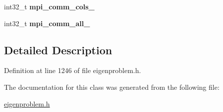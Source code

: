 \begin{DoxyCompactItemize}
\item 
\hypertarget{class_eigenproblem__elpa_a546364503d970dd20a45372ecb75588a}{}int32\+\_\+t {\bfseries mpi\+\_\+comm\+\_\+cols\+\_\+}\label{class_eigenproblem__elpa_a546364503d970dd20a45372ecb75588a}

\item 
\hypertarget{class_eigenproblem__elpa_adc6f4259dff353d1d9f8fa6d54503106}{}int32\+\_\+t {\bfseries mpi\+\_\+comm\+\_\+all\+\_\+}\label{class_eigenproblem__elpa_adc6f4259dff353d1d9f8fa6d54503106}

\end{DoxyCompactItemize}


\subsection{Detailed Description}


Definition at line 1246 of file eigenproblem.\+h.



The documentation for this class was generated from the following file\+:\begin{DoxyCompactItemize}
\item 
\hyperlink{eigenproblem_8h}{eigenproblem.\+h}\end{DoxyCompactItemize}
